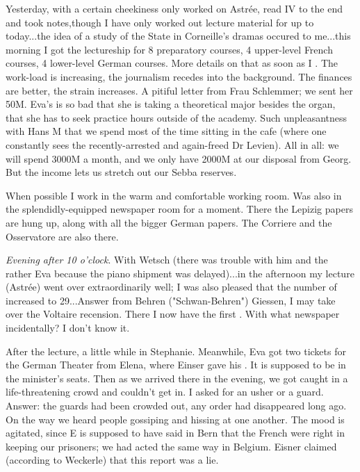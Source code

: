 
Yesterday, with a certain cheekiness only worked on Astrée, read IV to the end and took notes,though I have only worked out lecture material for up to today...the idea of a study of the State in Corneille's dramas occured to me...this morning I got the lectureship for 8 preparatory courses, 4 upper-level French courses, 4 lower-level German courses. More details on that as soon as I . The work-load is increasing, the journalism recedes into the background. The finances are better, the strain increases. A pitiful letter from Frau Schlemmer; we sent her 50M. Eva's  is so bad that she is taking a theoretical major besides the organ, that she has to seek practice hours outside of the academy. Such unpleasantness with Hans M that we spend most of the time sitting in the cafe (where one constantly sees the recently-arrested and again-freed Dr Levien). All in all: we will spend 3000M a month, and we only have 2000M at our disposal from Georg. But the income lets us stretch out our Sebba reserves.

When possible I work in the warm and comfortable working room. Was also in the splendidly-equipped newspaper room for a moment. There the Lepizig papers are hung up, along with all the bigger German papers. The Corriere and the Osservatore are also there. \missing

\textit{Evening after 10 o'clock}. With Wetsch (there was trouble with him and the rather  Eva because the piano shipment was delayed)...in the afternoon my lecture (Astrée) went over extraordinarily well; I was also pleased that the number of  increased to 29...Answer from Behren ("Schwan-Behren") Giessen, I may take over the Voltaire recension. There I now have the first . With what newspaper incidentally? I don't know it.

After the lecture, a little while in Stephanie. Meanwhile, Eva got two tickets for the German Theater from Elena, where Einser gave his . It is supposed to be in the minister's seats. Then as we arrived there in the evening, we got caught in a life-threatening crowd and couldn't get in. I asked for an usher or a guard. Answer: the guards had been crowded out, any order had disappeared long ago. On the way we heard people gossiping and hissing at one another. The mood is agitated, since E is supposed to have said in Bern that the French were right in keeping our prisoners; we had acted the same way in Belgium. Eisner claimed (according to Weckerle) that this report was a lie.

